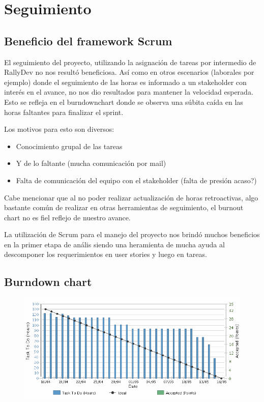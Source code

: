 \section{Seguimiento}
\subsection{Beneficio del framework Scrum}
El seguimiento del proyecto, utilizando la asignaci\'on de tareas por intermedio de RallyDev no nos result\'o beneficiosa. As\'i como en otros escenarios (laborales por ejemplo) donde el seguimiento de las horas es informado a un stakeholder con inter\'es en el avance, no nos dio resultados para mantener la velocidad esperada. Esto se refleja en el burndownchart donde se observa una s\'ubita ca\'ida en las horas faltantes para finalizar el sprint.

Los motivos para esto son diversos:
\begin{itemize}
    \item Conocimiento grupal de las tareas 
    \item Y de lo faltante (mucha comunicaci\'on por mail)
    \item Falta de comunicaci\'on del equipo con el stakeholder (falta de presi\'on acaso?)
\end{itemize}

Cabe mencionar que al no poder realizar actualización de horas retroactivas, algo bastante común de realizar en otras herramientas de seguimiento, el burnout chart no es fiel reflejo de nuestro avance.

La utilizaci\'on de Scrum para el manejo del proyecto nos brindó muchos beneficios en la primer etapa de an\'alis siendo una heramienta de mucha ayuda al descomponer los requerimientos en user stories y luego en tareas.

\subsection{Burndown chart}
\begin{figure}[ht]
\includegraphics[width=\textwidth]{./imgs/burndown.png}
\end{figure}
